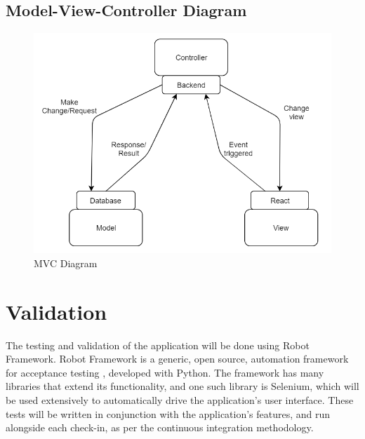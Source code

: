         \pagebreak

    \subsection{Model-View-Controller Diagram}

    \hfill\break

        \begin{figure}[!h]
            \center
            \includegraphics[width=155mm]{../figures/MVC}
            \caption{MVC Diagram}
        \end{figure}

\section{Validation}
    The testing and validation of the application will be done using Robot Framework. Robot Framework is a generic, open source, automation framework for acceptance testing \cite{Robot}, developed with Python. The framework has many libraries that extend its functionality, and one such library is Selenium, which will be used extensively to automatically drive the application\textquoteright s user interface. These tests will be written in conjunction with the application\textquoteright s features, and run alongside each check-in, as per the continuous integration methodology.